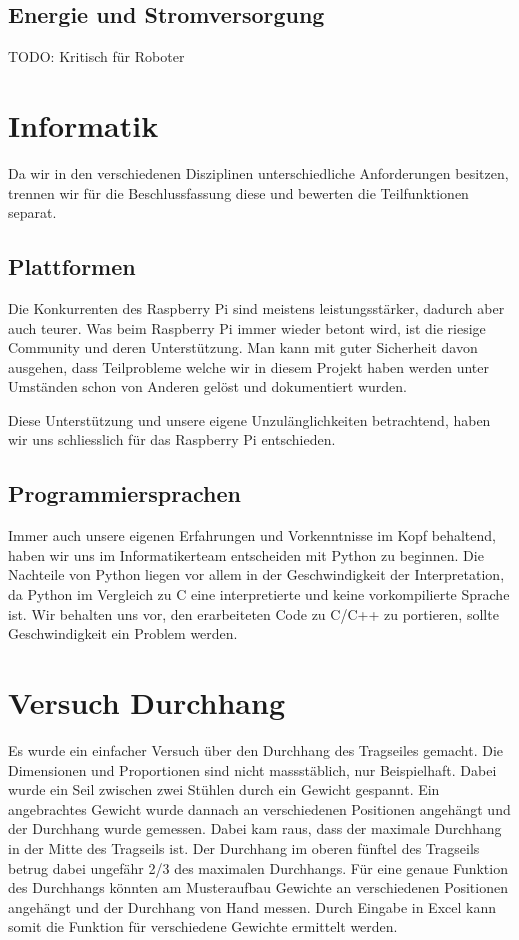 \documentclass[a4paper]{report}
\begin{document}
\subsection{Energie und Stromversorgung}
TODO: Kritisch für Roboter

\section{Informatik}
Da wir in den verschiedenen Disziplinen unterschiedliche Anforderungen besitzen, trennen wir für die Beschlussfassung diese und bewerten die Teilfunktionen separat.

\subsection{Plattformen}

Die Konkurrenten des Raspberry Pi sind meistens leistungsstärker, dadurch aber auch teurer. Was beim Raspberry Pi immer wieder betont wird, ist die riesige Community und deren Unterstützung. Man kann mit guter Sicherheit davon ausgehen, dass Teilprobleme welche wir in diesem Projekt haben werden unter Umständen schon von Anderen gelöst und dokumentiert wurden.

Diese Unterstützung und unsere eigene Unzulänglichkeiten betrachtend, haben wir uns schliesslich für das Raspberry Pi entschieden.

\subsection{Programmiersprachen}

Immer auch unsere eigenen Erfahrungen und Vorkenntnisse im Kopf behaltend, haben wir uns im Informatikerteam entscheiden mit Python zu beginnen. Die Nachteile von Python liegen vor allem in der Geschwindigkeit der Interpretation, da Python im Vergleich zu C eine interpretierte und keine vorkompilierte Sprache ist. Wir behalten uns vor, den erarbeiteten Code zu C/C++ zu portieren, sollte Geschwindigkeit ein Problem werden.

\section{Versuch Durchhang}
Es wurde ein einfacher Versuch über den Durchhang des Tragseiles gemacht. Die Dimensionen und Proportionen sind nicht massstäblich, nur Beispielhaft. Dabei wurde ein Seil zwischen zwei Stühlen durch ein Gewicht gespannt. Ein angebrachtes Gewicht wurde dannach an verschiedenen Positionen angehängt und der Durchhang wurde gemessen. Dabei kam raus, dass der maximale Durchhang in der Mitte des Tragseils ist. Der Durchhang im oberen fünftel des Tragseils betrug dabei ungefähr 2/3 des maximalen Durchhangs.
Für eine genaue Funktion des Durchhangs könnten am Musteraufbau Gewichte an verschiedenen Positionen angehängt und der Durchhang von Hand messen. Durch Eingabe in Excel kann somit die Funktion für verschiedene Gewichte ermittelt werden.
\end{document}
